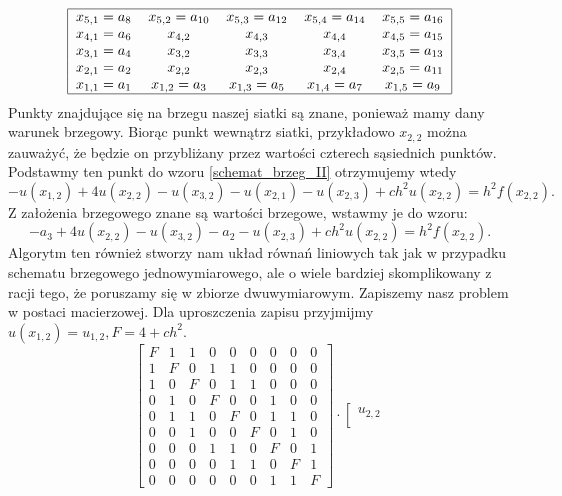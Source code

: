 \documentclass[12pt,a4paper]{report}
\begin{document}
\begin{problem}
\begin{example}
\begin{align*}
\begin{tabular}{|ccccc|}
\hline
$ x_{5,1}=a_8$ & $x_{5,2}=a_{10}$ & $x_{5,3}=a_{12}$ & $x_{5,4}=a_{14}$ &$ x_{5,5}=a_{16}$ \\
$x_{4,1} = a_6$ &$ x_{4,2}$ & $x_{4,3}$ & $x_{4,4}$ & $x_{4,5} = a_{15}$ \\
$x_{3,1} = a_4$ & $x_{3,2}$ & $x_{3,3}$ & $x_{3,4}$ & $x_{3,5} = a_{13}$ \\
$x_{2,1} = a_2$ & $x_{2,2}$ & $x_{2,3}$ & $x_{2,4}$ & $x_{2,5} = a_{11}$ \\
$x_{1,1} = a_1$ &$x_{1,2}=a_3$ & $x_{1,3}=a_5$ & $x_{1,4}=a_7$ & $x_{1,5} = a_{9}$ \\
\hline
\end{tabular}
\end{align*}
Punkty znajdujące się na brzegu naszej siatki są znane, ponieważ mamy dany warunek brzegowy. Biorąc punkt wewnątrz siatki, przykładowo $x_{2,2}$ można zauważyć, że będzie on przybliżany przez wartości czterech sąsiednich punktów. Podstawmy ten punkt do wzoru \eqref{schemat_brzeg_II} otrzymujemy wtedy
$$
-u(x_{1,2}) + 4u(x_{2,2}) - u(x_{3,2}) - u(x_{2,1}) - u(x_{2,3}) + ch^2u(x_{2,2}) = h^2f(x_{2,2}).
$$
Z założenia brzegowego znane są wartości brzegowe, wstawmy je do wzoru:
$$
-a_3 + 4u(x_{2,2}) - u(x_{3,2}) - a_2 - u(x_{2,3}) + ch^2u(x_{2,2}) = h^2f(x_{2,2}).
$$
Algorytm ten również stworzy nam układ równań liniowych tak jak w przypadku schematu brzegowego jednowymiarowego, ale o wiele bardziej skomplikowany z racji tego, że poruszamy się w zbiorze dwuwymiarowym. Zapiszemy nasz problem w postaci macierzowej. Dla uproszczenia zapisu przyjmijmy $u(x_{1,2}) = u_{1,2}, F= 4+ch^2$.
$$
\left[ \begin{array}{ccccccccc}
F & 1 & 1 & 0 & 0 & 0& 0 & 0 & 0\\
1 & F & 0 & 1 & 1 & 0 & 0 & 0 & 0 \\
1 & 0 & F & 0 & 1 & 1& 0 & 0 & 0 \\
0 & 1 & 0 & F & 0& 0 & 1 & 0 & 0  \\ 
0 & 1 & 1& 0 & F & 0& 1 & 1 & 0 \\
0 & 0 & 1 & 0 & 0 & F & 0 & 1 & 0 \\
0 & 0 & 0 & 1 & 1 & 0 & F & 0 & 1 \\
0 & 0 & 0 & 0 & 1 & 1 & 0 & F & 1 \\
0 & 0 & 0 & 0 & 0 & 0 & 1 & 1 & F
\end{array} \right] \cdot
\left[ \begin{array}{c}
u_{2,2} \\

\end{array}$$
\end{example}
\end{problem}
\end{document}
